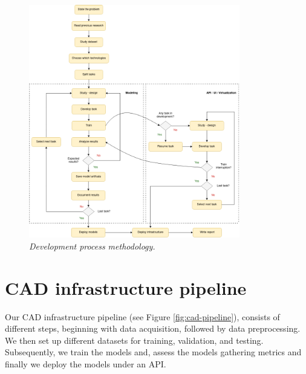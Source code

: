 \newpage

\begin{landscape}

  \begin{figure}[H]
  \centering
  \includegraphics[width=0.82\textwidth]{imatges/planing_and_methodology/EmplyedMethodology.png}
  \caption{\textit{Development process methodology.}}
  \label{fig:flux_development}
  \end{figure}

\end{landscape}

\newpage

\section{CAD infrastructure pipeline}

Our CAD infrastructure pipeline  (see Figure \ref{fig:cad-pipeline}), consists
of different steps, beginning with data acquisition, followed by data
preprocessing. We then set up different datasets for training, validation, and
testing. Subsequently, we train the models and, assess the models gathering
metrics and finally we deploy the models under an API.

